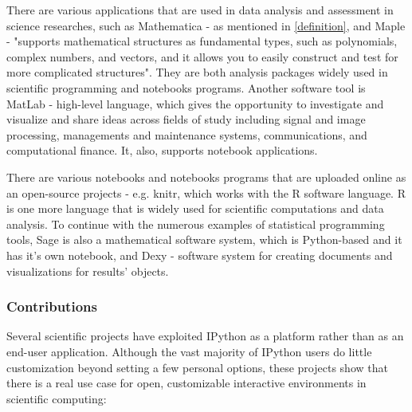 There are various applications that are used in data analysis and assessment in science researches, such as Mathematica - as mentioned in \ref{definition}, and Maple - "supports mathematical structures as fundamental types, such as polynomials, complex numbers, and vectors, and it allows you to easily construct and test for more complicated structures".\cite{mathematicaWiki} \cite{maple} They are both analysis packages widely used in scientific programming and notebooks programs. Another software tool is MatLab - high-level language, which gives the opportunity to investigate and visualize and share ideas across fields of study including signal and image processing, managements and maintenance systems, communications, and computational finance.\cite{matLab} It, also, supports notebook applications.

There are various notebooks and notebooks programs that are uploaded online as an open-source projects - e.g. knitr, which works with the R software language. R is one more language that is widely used for scientific computations and data analysis.\cite{knitr} To continue with the numerous examples of statistical programming tools, Sage is also a mathematical software system, which is Python-based and it has it's own notebook, and Dexy - software system for creating documents and visualizations for results' objects.\cite{sage}\cite{dexy}\cite{shen2014interactive} 

\subsubsection{Contributions}

Several scientific projects have exploited IPython as a platform
rather than as an end-user application. Although
the vast majority of IPython users do little customization beyond
setting a few personal options, these projects show
that there is a real use case for open, customizable interactive
environments in scientific computing:\cite{perez2007ipython}

